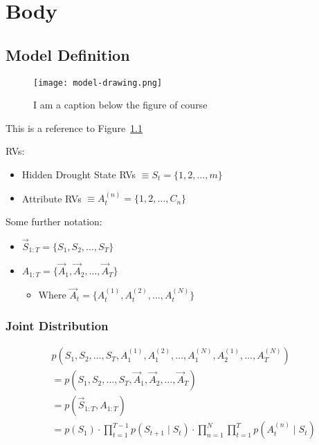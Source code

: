 \graphicspath{{body/fig/}}

\chapter{Body}
\label{chap:body}

\section{Model Definition}

\begin{figure}[!h]
    \centering
    \texttt{[image: model-drawing.png]}
    \caption[I am the short caption that appears in the list of figures, without references.]{ I am a caption below the figure of course}
    \label{fig:model-drawing}
\end{figure}

This is a reference to Figure~\ref{fig:model-drawing}

RVs:
\begin{itemize}
    \item Hidden Drought State RVs $\equiv S_t = \{1,2,\dots,m\}$    
    \item Attribute RVs $\equiv A^{(n)}_t = \{1,2,\dots,C_n\}$
\end{itemize}

Some further notation:
\begin{itemize}
    \item $\vec{S}_{1:T}  = \{S_1,S_2,\dots,S_T\}$    
    \item $A_{1:T} = \{\vec{A}_1,\vec{A}_2,\dots,\vec{A}_T\}$
    \begin{itemize}
        \item Where $\vec{A}_t = \{ A^{(1)}_t, A^{(2)}_t, \dots, A^{(N)}_t\}$
    \end{itemize}
\end{itemize}


\subsection{Joint Distribution}

\[
\begin{align}
    &p(S_1, S_2, \dots, S_T, A^{(1)}_1, A^{(2)}_1, \dots, A^{(N)}_1, A^{(1)}_2, \dots, A^{(N)}_T) \\ 
    &= p(S_1, S_2, \dots, S_T, \vec{A}_1, \vec{A}_2, \dots, \vec{A}_T) \\
    &= p(\vec{S}_{1:T}, A_{1:T}) \\
    &= p(S_1) \cdot \prod\limits_{t=1}^{T-1} p(S_{t+1} \mid S_t) \cdot \prod\limits_{n=1}^{N} \prod\limits_{t=1}^T p(A^{(n)}_t \mid S_t)
\end{align}
\]

